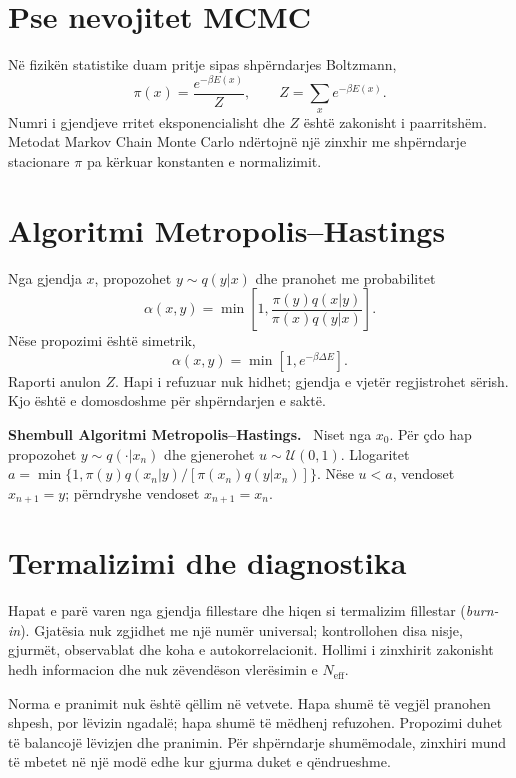 \documentclass[11pt,oneside,openany]{book}
\newenvironment{shembull}[1][]{\par\medskip\noindent\textbf{Shembull #1.}\ }{\par\medskip}
\begin{document}
\section{Pse nevojitet MCMC}
Në fizikën statistike duam pritje sipas shpërndarjes Boltzmann,
\begin{equation}
 \pi(x)=\frac{e^{-\beta E(x)}}{Z},\qquad
 Z=\sum_xe^{-\beta E(x)}.
\end{equation}
Numri i gjendjeve rritet eksponencialisht dhe $Z$ është zakonisht i paarritshëm. Metodat Markov Chain Monte Carlo ndërtojnë një zinxhir me shpërndarje stacionare $\pi$ pa kërkuar konstanten e normalizimit.

\section{Algoritmi Metropolis--Hastings}
Nga gjendja $x$, propozohet $y\sim q(y|x)$ dhe pranohet me probabilitet
\begin{equation}
 \alpha(x,y)=\min\left[1,\frac{\pi(y)q(x|y)}{\pi(x)q(y|x)}\right].
\end{equation}
Nëse propozimi është simetrik,
\begin{equation}
 \alpha(x,y)=\min[1,e^{-\beta\Delta E}].
\end{equation}
Raporti anulon $Z$. Hapi i refuzuar nuk hidhet; gjendja e vjetër regjistrohet sërish. Kjo është e domosdoshme për shpërndarjen e saktë.

\begin{shembull}[Algoritmi Metropolis--Hastings]
Niset nga $x_0$. Për çdo hap propozohet $y\sim q(\cdot|x_n)$ dhe gjenerohet $u\sim\mathcal U(0,1)$. Llogaritet $a=\min\{1,\pi(y)q(x_n|y)/[\pi(x_n)q(y|x_n)]\}$. Nëse $u<a$, vendoset $x_{n+1}=y$; përndryshe vendoset $x_{n+1}=x_n$.
\end{shembull}

\section{Termalizimi dhe diagnostika}
Hapat e parë varen nga gjendja fillestare dhe hiqen si termalizim fillestar (\emph{burn-in}). Gjatësia nuk zgjidhet me një numër universal; kontrollohen disa nisje, gjurmët, observablat dhe koha e autokorrelacionit. Hollimi i zinxhirit zakonisht hedh informacion dhe nuk zëvendëson vlerësimin e $N_{\mathrm{eff}}$.

Norma e pranimit nuk është qëllim në vetvete. Hapa shumë të vegjël pranohen shpesh, por lëvizin ngadalë; hapa shumë të mëdhenj refuzohen. Propozimi duhet të balancojë lëvizjen dhe pranimin. Për shpërndarje shumëmodale, zinxhiri mund të mbetet në një modë edhe kur gjurma duket e qëndrueshme.
\end{document}
